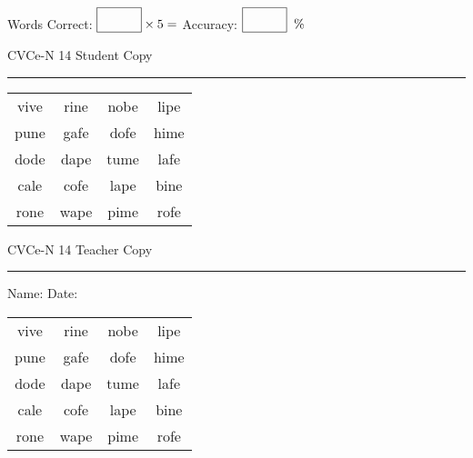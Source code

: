 \documentclass{memoir}
\begin{document}
\small

Words Correct: $\fbox{\phantom{\huge 100}} \times 5 = $ Accuracy: $\fbox{\phantom{\huge 100}}\;\; \%$ 

\vfill

\newpage


\footnotesize \noindent
CVCe-N 14 \hfill Student Copy
\smallskip
\hrule

\Large

\setlength{\tabcolsep}{14pt}
\def\arraystretch{2}

{\selectfont


\begin{vplace}[0.5]
\begin{center}
\begin{tabular}{cccc}
vive & rine & nobe & lipe \\
pune & gafe & dofe & hime \\
dode & dape & tume & lafe \\
cale & cofe & lape & bine \\
rone & wape & pime & rofe \\
\end{tabular}
\end{center}
\end{vplace}

}

\newpage

\footnotesize \noindent
CVCe-N 14 \hfill Teacher Copy
\smallskip
\hrule

\small

\vfill

\noindent
Name: \underline{\hspace{1.75in}} \hfill Date: \underline{\hspace{1in}}

\Large

{\selectfont


\begin{vplace}[0.5]
\begin{center}
\begin{tabular}{cccc}
vive & rine & nobe & lipe \\
pune & gafe & dofe & hime \\
dode & dape & tume & lafe \\
cale & cofe & lape & bine \\
rone & wape & pime & rofe \\
\end{tabular}
\end{center}
\end{vplace}



}
\end{document}

